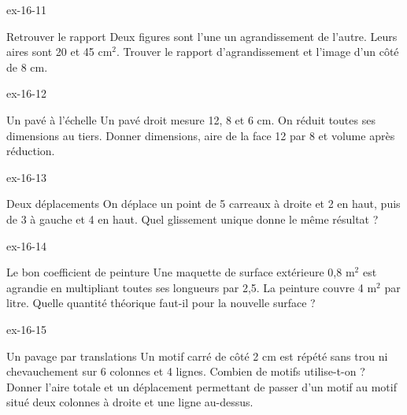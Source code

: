 \begin{blocLivre}{ex-16-11}\begin{exercice}[3]{Retrouver le rapport}
Deux figures sont l’une un agrandissement de l’autre. Leurs aires sont 20 et 45 cm$^2$. Trouver le rapport d’agrandissement et l’image d’un côté de 8 cm.
\label{fig-ex-16-11}
\end{exercice}\end{blocLivre}
\begin{blocLivre}{ex-16-12}\begin{exercice}[3]{Un pavé à l’échelle}
Un pavé droit mesure 12, 8 et 6 cm. On réduit toutes ses dimensions au tiers. Donner dimensions, aire de la face 12 par 8 et volume après réduction.
\label{fig-ex-16-12}
\end{exercice}\end{blocLivre}
\begin{blocLivre}{ex-16-13}\begin{exercice}[3]{Deux déplacements}
On déplace un point de 5 carreaux à droite et 2 en haut, puis de 3 à gauche et 4 en haut. Quel glissement unique donne le même résultat ?
\label{fig-ex-16-13}
\end{exercice}\end{blocLivre}
\begin{blocLivre}{ex-16-14}\begin{exercice}[3]{Le bon coefficient de peinture}
Une maquette de surface extérieure 0,8 m$^2$ est agrandie en multipliant toutes ses longueurs par 2,5. La peinture couvre 4 m$^2$ par litre. Quelle quantité théorique faut-il pour la nouvelle surface ?
\label{fig-ex-16-14}
\end{exercice}\end{blocLivre}
\begin{blocLivre}{ex-16-15}\begin{exercice}[3]{Un pavage par translations}
Un motif carré de côté 2 cm est répété sans trou ni chevauchement sur 6 colonnes et 4 lignes. Combien de motifs utilise-t-on ? Donner l’aire totale et un déplacement permettant de passer d’un motif au motif situé deux colonnes à droite et une ligne au-dessus.
\label{fig-ex-16-15}
\end{exercice}\end{blocLivre}

\clearpage
